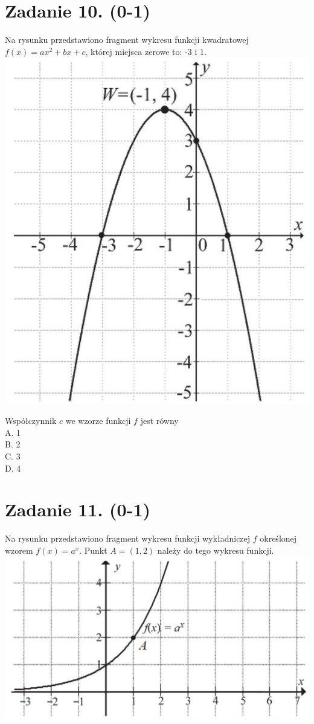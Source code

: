 \documentclass[10pt]{article}
\begin{document}
\section*{Zadanie 10. (0-1)}
Na rysunku przedstawiono fragment wykresu funkcji kwadratowej \(f(x)=a x^{2}+b x+c\), której miejsca zerowe to: -3 i 1.\\
\includegraphics[max width=\textwidth, center]{2024_11_21_7b5527312ea89ae66fd0g-06}

Współczynnik \(c\) we wzorze funkcji \(f\) jest równy\\
A. 1\\
B. 2\\
C. 3\\
D. 4

\section*{Zadanie 11. (0-1)}
Na rysunku przedstawiono fragment wykresu funkcji wykładniczej \(f\) określonej wzorem \(f(x)=a^{x}\). Punkt \(A=(1,2)\) należy do tego wykresu funkcji.\\
\includegraphics[max width=\textwidth, center]{2024_11_21_7b5527312ea89ae66fd0g-06(1)}
\end{document}
